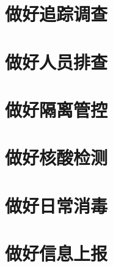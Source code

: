 \section{做好追踪调查}
\section{做好人员排查}
\section{做好隔离管控}
\section{做好核酸检测}
\section{做好日常消毒}
\section{做好信息上报}
